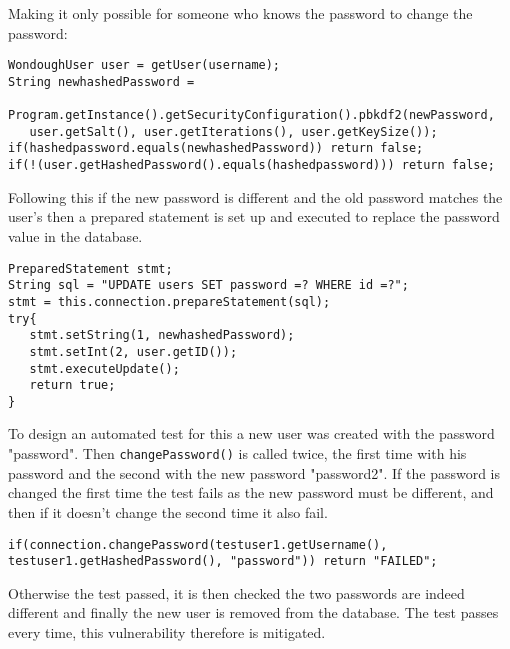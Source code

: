 Making it only possible for someone who knows the password to change the password:
\begin{verbatim}
WondoughUser user = getUser(username);
String newhashedPassword =
   Program.getInstance().getSecurityConfiguration().pbkdf2(newPassword,
   user.getSalt(), user.getIterations(), user.getKeySize());
if(hashedpassword.equals(newhashedPassword)) return false;
if(!(user.getHashedPassword().equals(hashedpassword))) return false;
\end{verbatim}
Following this if the new password is different and the old password matches the user's then a prepared statement is set up and executed to replace the password value in the database.
\begin{verbatim}
PreparedStatement stmt;
String sql = "UPDATE users SET password =? WHERE id =?";
stmt = this.connection.prepareStatement(sql);
try{
   stmt.setString(1, newhashedPassword);
   stmt.setInt(2, user.getID());
   stmt.executeUpdate();
   return true;
}
\end{verbatim}
To design an automated test for this a new user was created with the password "password". Then \verb|changePassword()| is called twice, the first time with his password and the second with
the new password "password2". If the password is changed the first time the test fails as the new password must be different, and then if it doesn't change the second time it also fail.
\begin{verbatim}
if(connection.changePassword(testuser1.getUsername(),
testuser1.getHashedPassword(), "password")) return "FAILED";
\end{verbatim}
Otherwise the test passed, it is then checked the two passwords are indeed different and finally the new user is removed from the database. The test passes every time, this vulnerability therefore
is mitigated.
